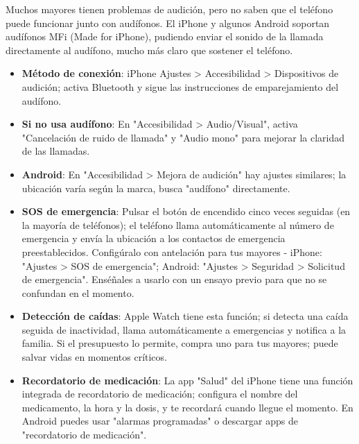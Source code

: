 
Muchos mayores tienen problemas de audición, pero no saben que el teléfono puede funcionar junto con audífonos. El iPhone y algunos Android soportan audífonos MFi (Made for iPhone), pudiendo enviar el sonido de la llamada directamente al audífono, mucho más claro que sostener el teléfono.

\begin{itemize}
  \item \textbf{Método de conexión}: iPhone Ajustes > Accesibilidad > Dispositivos de audición; activa Bluetooth y sigue las instrucciones de emparejamiento del audífono.
  \item \textbf{Si no usa audífono}: En "Accesibilidad > Audio/Visual", activa "Cancelación de ruido de llamada" y "Audio mono" para mejorar la claridad de las llamadas.
  \item \textbf{Android}: En "Accesibilidad > Mejora de audición" hay ajustes similares; la ubicación varía según la marca, busca "audífono" directamente.
\end{itemize}


\begin{itemize}
  \item \textbf{SOS de emergencia}: Pulsar el botón de encendido cinco veces seguidas (en la mayoría de teléfonos); el teléfono llama automáticamente al número de emergencia y envía la ubicación a los contactos de emergencia preestablecidos. Configúralo con antelación para tus mayores - iPhone: "Ajustes > SOS de emergencia"; Android: "Ajustes > Seguridad > Solicitud de emergencia". Enséñales a usarlo con un ensayo previo para que no se confundan en el momento.
  \item \textbf{Detección de caídas}: Apple Watch tiene esta función; si detecta una caída seguida de inactividad, llama automáticamente a emergencias y notifica a la familia. Si el presupuesto lo permite, compra uno para tus mayores; puede salvar vidas en momentos críticos.
  \item \textbf{Recordatorio de medicación}: La app "Salud" del iPhone tiene una función integrada de recordatorio de medicación; configura el nombre del medicamento, la hora y la dosis, y te recordará cuando llegue el momento. En Android puedes usar "alarmas programadas" o descargar apps de "recordatorio de medicación".
\end{itemize}

